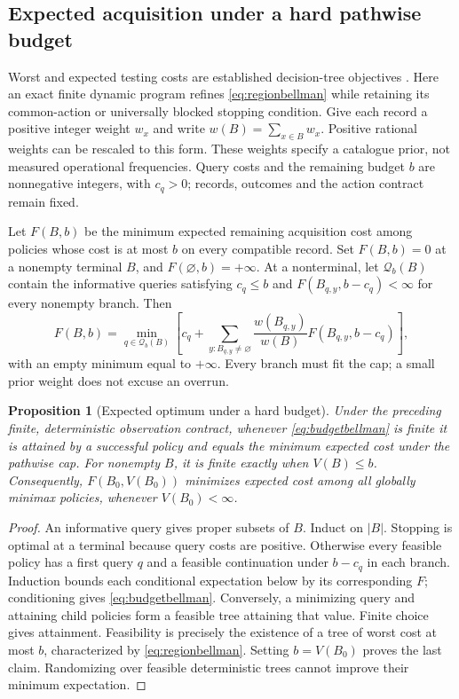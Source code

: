 \documentclass[11pt,a4paper]{article}
\newtheorem{proposition}[theorem]{Proposition}
\theoremstyle{definition}\newtheorem{definition}[theorem]{Definition}
\begin{document}
\subsection{Expected acquisition under a hard pathwise budget}\label{sec:budgetedregions}
Worst and expected testing costs are established decision-tree objectives \cite{cicalese2014}. Here an exact finite dynamic program refines \eqref{eq:regionbellman} while retaining its common-action or universally blocked stopping condition. Give each record a positive integer weight $w_x$ and write $w(B)=\sum_{x\in B}w_x$. Positive rational weights can be rescaled to this form. These weights specify a catalogue prior, not measured operational frequencies. Query costs and the remaining budget $b$ are nonnegative integers, with $c_q>0$; records, outcomes and the action contract remain fixed.

Let $F(B,b)$ be the minimum expected remaining acquisition cost among policies whose cost is at most $b$ on every compatible record. Set $F(B,b)=0$ at a nonempty terminal $B$, and $F(\varnothing,b)=+\infty$. At a nonterminal, let $\mathcal Q_b(B)$ contain the informative queries satisfying $c_q\le b$ and $F(B_{q,y},b-c_q)<\infty$ for every nonempty branch. Then
\begin{equation}
 F(B,b)=\min_{q\in\mathcal Q_b(B)}\left[
 c_q+\sum_{y:B_{q,y}\ne\varnothing}
 \frac{w(B_{q,y})}{w(B)}F(B_{q,y},b-c_q)\right],
 \label{eq:budgetbellman}
\end{equation}
with an empty minimum equal to $+\infty$. Every branch must fit the cap; a small prior weight does not excuse an overrun.

\begin{proposition}[Expected optimum under a hard budget]\label{prop:budgetoptimal}
Under the preceding finite, deterministic observation contract, whenever \eqref{eq:budgetbellman} is finite it is attained by a successful policy and equals the minimum expected cost under the pathwise cap. For nonempty $B$, it is finite exactly when $V(B)\le b$. Consequently, $F(B_0,V(B_0))$ minimizes expected cost among all globally minimax policies, whenever $V(B_0)<\infty$.
\end{proposition}
\begin{proof}
An informative query gives proper subsets of $B$. Induct on $|B|$. Stopping is optimal at a terminal because query costs are positive. Otherwise every feasible policy has a first query $q$ and a feasible continuation under $b-c_q$ in each branch. Induction bounds each conditional expectation below by its corresponding $F$; conditioning gives \eqref{eq:budgetbellman}. Conversely, a minimizing query and attaining child policies form a feasible tree attaining that value. Finite choice gives attainment. Feasibility is precisely the existence of a tree of worst cost at most $b$, characterized by \eqref{eq:regionbellman}. Setting $b=V(B_0)$ proves the last claim. Randomizing over feasible deterministic trees cannot improve their minimum expectation.
\end{proof}
\end{document}
